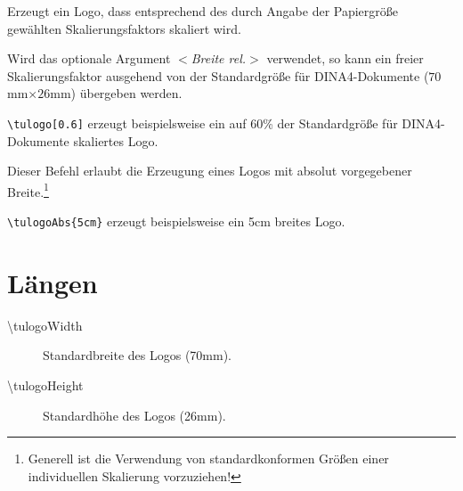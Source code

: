 \documentclass{scrartcl}
\begin{document}
\begin{description}\label{cmd:tulogo}
  \item[\color{tuRed}\mdseries\ttfamily \textbackslash tulogo%
    {[\textcolor{tuGreenDark}{\sffamily\itshape $<$Breite rel.$>$}]}]
    Erzeugt ein Logo, dass entsprechend des durch Angabe der Papiergröße
    gewählten Skalierungsfaktors skaliert wird.

    Wird das optionale Argument {\sffamily\itshape $<$Breite rel.$>$}
    verwendet, so kann ein freier Skalierungsfaktor ausgehend von der
    Standardgröße für DINA4-Dokumente ($70$mm$\times 26$mm) übergeben werden.

    \lstinline!\tulogo[0.6]! erzeugt beispielsweise ein auf 60\% der 
    Standardgröße für DINA4-Dokumente skaliertes Logo.
    
  \item[\color{tuRed}\ttfamily \textbackslash tulogoAbs%
    \{\textcolor{tuGreenDark}{Breite abs.}\}]
    Dieser Befehl erlaubt die Erzeugung eines Logos mit absolut vorgegebener
    Breite.\footnote{Generell ist die Verwendung von standardkonformen Größen
    einer individuellen Skalierung vorzuziehen!}
    
    \lstinline!\tulogoAbs{5cm}! erzeugt beispielsweise ein 5cm breites Logo.
\end{description}


\section{Längen}
  \begin{description}
    \item[\mdseries\ttfamily \textbackslash tulogoWidth]
      Standardbreite des Logos (70mm).
    \item[\mdseries\ttfamily \textbackslash tulogoHeight]
      Standardhöhe des Logos (26mm).
  \end{description}
\end{document}
